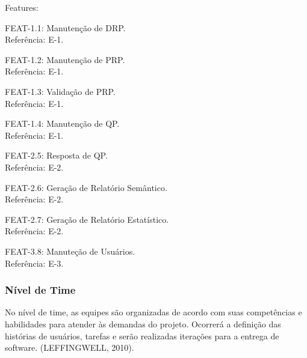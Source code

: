 			\begin{itemize}
			{
				\item Features:
				\begin{itemize}
				{
					\item FEAT-1.1: Manutenção de DRP.\\
					Referência: E-1.

					\item FEAT-1.2: Manutenção de PRP.\\
					Referência: E-1.

					\item FEAT-1.3: Validação de PRP.\\
					Referência: E-1.

					\item FEAT-1.4: Manutenção de QP.\\
					Referência: E-1.

					\item FEAT-2.5: Resposta de QP.\\
					Referência: E-2.

					\item FEAT-2.6: Geração de Relatório Semântico.\\
					Referência: E-2.

					\item FEAT-2.7: Geração de Relatório Estatístico.\\
					Referência: E-2.

					\item FEAT-3.8: Manuteção de Usuários.\\
					Referência: E-3.
				}
				\end{itemize}
			}
			\end{itemize}

		\subsubsection{Nível de Time}

			No nível de time, as equipes são organizadas de acordo com suas competências e habilidades para atender às demandas do projeto. Ocorrerá a definição das histórias de usuários, tarefas e serão realizadas iterações para a entrega de software. (LEFFINGWELL, 2010).

